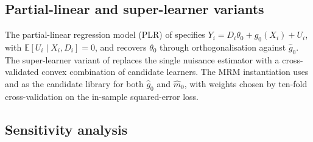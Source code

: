 \documentclass[article,shortnames,nojss]{jss}
\renewcommand{\E}{\mathbb{E}}
\begin{document}
\subsection{Partial-linear and super-learner variants}

The partial-linear regression model (PLR) of
\citet{Chernozhukov2018DML} specifies $Y_i = D_i \theta_0 +
g_0(X_i) + U_i$, with $\E[U_i \mid X_i, D_i] = 0$, and recovers
$\theta_0$ through orthogonalisation against $\hat{g}_0$. The
super-learner variant of \citet{vanderLaan2007SL} replaces the
single nuisance estimator with a cross-validated convex combination
of candidate learners. The MRM instantiation uses 
\citep{Friedman2010glmnet} and 
\citep{Wright2017ranger} as the candidate library for both
$\hat{g}_0$ and $\hat{m}_0$, with weights chosen by ten-fold
cross-validation on the in-sample squared-error loss.

\subsection{Sensitivity analysis}
\end{document}
